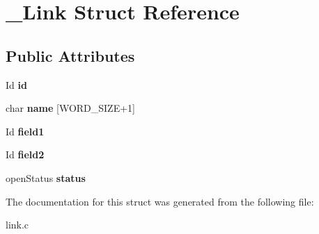 \hypertarget{struct__Link}{}\section{\+\_\+\+Link Struct Reference}
\label{struct__Link}
\subsection*{Public Attributes}
\begin{DoxyCompactItemize}
\item 
\mbox{\label{struct__Link_a151212e7a8e8274c2a1ee991ba95878b}} 
Id {\bfseries id}
\item 
\mbox{\label{struct__Link_a020ee863120055b29609157b9de3c84d}} 
char {\bfseries name} \mbox{[}W\+O\+R\+D\+\_\+\+S\+I\+ZE+1\mbox{]}
\item 
\mbox{\label{struct__Link_a450ac5e4f381e0ff8cf250fea60f8f1c}} 
Id {\bfseries field1}
\item 
\mbox{\label{struct__Link_a3206e5f29b62d4596c77e63ba4bc8962}} 
Id {\bfseries field2}
\item 
\mbox{\label{struct__Link_ad1f29665cd61a1bbcf1978cac9f8e7b4}} 
open\+Status {\bfseries status}
\end{DoxyCompactItemize}


The documentation for this struct was generated from the following file\+:\begin{DoxyCompactItemize}
\item 
link.\+c\end{DoxyCompactItemize}
